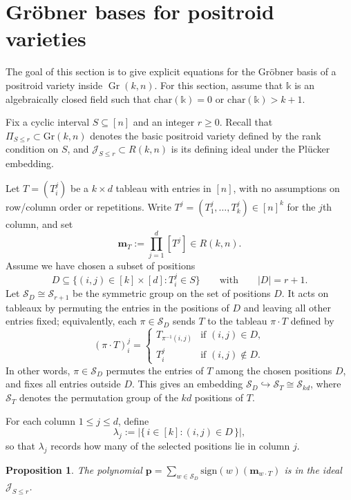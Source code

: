 \documentclass[12pt,reqno]{amsart}
\newtheorem{prop}[lemma]{Proposition}
\theoremstyle{definition}
\newcommand{\sgn}{\text{sign}}
\newcommand{\mm}{\mathbf m}
\renewcommand{\k}{\mathbb{k}}
\newcommand{\cJ}{\mathcal{J}}
\newcommand{\symm}{\mathcal{S}}
\newcommand{\gr}{\mathrm{Gr}}
\newcommand{\Gr}{\operatorname{Gr}}
\begin{document}
{%
\section{Gr\"{o}bner bases for  positroid varieties}\label{section: gb-equations}

The goal of this section is to give explicit equations for the Gr\"{o}bner basis of a positroid variety inside $\Gr(k,n)$.
For this section, assume that $\k$ is an algebraically closed field such that $\textrm{char}(\k) = 0$ or $\textrm{char}(\k) > k+1$.

Fix a cyclic interval $S\subseteq [n]$ and an integer $r\geq 0$.
Recall that \(\Pi_{S\le r}\subset \gr(k,n)\) denotes the basic positroid variety defined by the rank condition on \(S\),
and \(\cJ_{S\le r}\subset R(k,n)\) is its defining ideal under the Pl\"ucker embedding.


Let $T=(T_i^j)$ be a $k\times d$ tableau with entries in $[n]$, with no assumptions on row/column order or repetitions.
Write $T^j=(T_1^j,\dots,T_k^j)\in[n]^k$ for the $j$th column, and set
\[
\mm_T:=\prod_{j=1}^d [T^j]\in R(k,n).
\]
Assume we have chosen a subset of positions
\[
D\subseteq \{(i,j)\in [k]\times[d] : T_i^j\in S\}
\qquad\text{with}\qquad |D|=r+1.
\]
Let $\symm_D\cong \symm_{r+1}$ be the symmetric group on the set of positions $D$.
It acts on tableaux by permuting the entries in the positions of $D$ and leaving all other entries fixed; equivalently, each $\pi\in\symm_D$ sends $T$ to the tableau $\pi\cdot T$ defined by
\[
(\pi\cdot T)_{i}^{j}=
\begin{cases}
T_{\pi^{-1}(i,j)} & \text{if }(i,j)\in D,\\
T_i^j & \text{if }(i,j)\notin D.
\end{cases}
\]
In other words, \(\pi\in\symm_D\) permutes the entries of \(T\) among the chosen positions \(D\),
and fixes all entries outside \(D\).
This gives an embedding $\symm_D\hookrightarrow \symm_T\cong \symm_{kd}$, where $\symm_T$ denotes the permutation group of the $kd$ positions of $T$.

For each column $1\le j\le d$, define
\[
\lambda_j := |\{\, i\in[k] : (i,j)\in D \,\}|,
\]
so that $\lambda_j$ records how many of the selected positions lie in column $j$.

\begin{prop}\label{prop: positroid-equations}
The polynomial $\mathbf{p} = \sum_{w\in \symm_D} \sgn(w) (\mm_{w\cdot T})$ is in the ideal $\cJ_{S\leq r}$. 
\end{prop}

}
\end{document}
